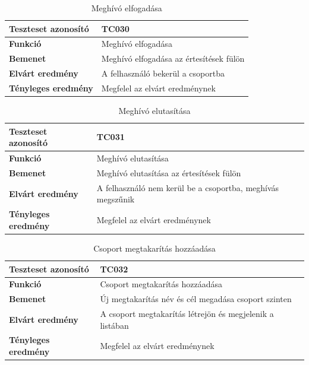\begin{table}[h!]
	\centering
	\begin{tabular}{|l|p{10cm}|}
		\hline
		\textbf{Teszteset azonosító} & TC030 \\ \hline
		\textbf{Funkció} & Meghívó elfogadása \\ \hline
		\textbf{Bemenet} & Meghívó elfogadása az értesítések fülön \\ \hline
		\textbf{Elvárt eredmény} & A felhasználó bekerül a csoportba \\ \hline
		\textbf{Tényleges eredmény} & Megfelel az elvárt eredménynek \\ \hline
	\end{tabular}
	\caption{Meghívó elfogadása}
	\label{tab:meghivo_elfogadasa}
\end{table}

\begin{table}[h!]
	\centering
	\begin{tabular}{|l|p{10cm}|}
		\hline
		\textbf{Teszteset azonosító} & TC031 \\ \hline
		\textbf{Funkció} & Meghívó elutasítása \\ \hline
		\textbf{Bemenet} & Meghívó elutasítása az értesítések fülön \\ \hline
		\textbf{Elvárt eredmény} & A felhasználó nem kerül be a csoportba, meghívás megszűnik \\ \hline
		\textbf{Tényleges eredmény} & Megfelel az elvárt eredménynek \\ \hline
	\end{tabular}
	\caption{Meghívó elutasítása}
	\label{tab:meghivo_elutasitasa}
\end{table}

\begin{table}[h!]
	\centering
	\begin{tabular}{|l|p{10cm}|}
		\hline
		\textbf{Teszteset azonosító} & TC032 \\ \hline
		\textbf{Funkció} & Csoport megtakarítás hozzáadása \\ \hline
		\textbf{Bemenet} & Új megtakarítás név és cél megadása csoport szinten \\ \hline
		\textbf{Elvárt eredmény} & A csoport megtakarítás létrejön és megjelenik a listában \\ \hline
		\textbf{Tényleges eredmény} & Megfelel az elvárt eredménynek \\ \hline
	\end{tabular}
	\caption{Csoport megtakarítás hozzáadása}
	\label{tab:csoport_megtakaritas_hozzaadas}
\end{table}

